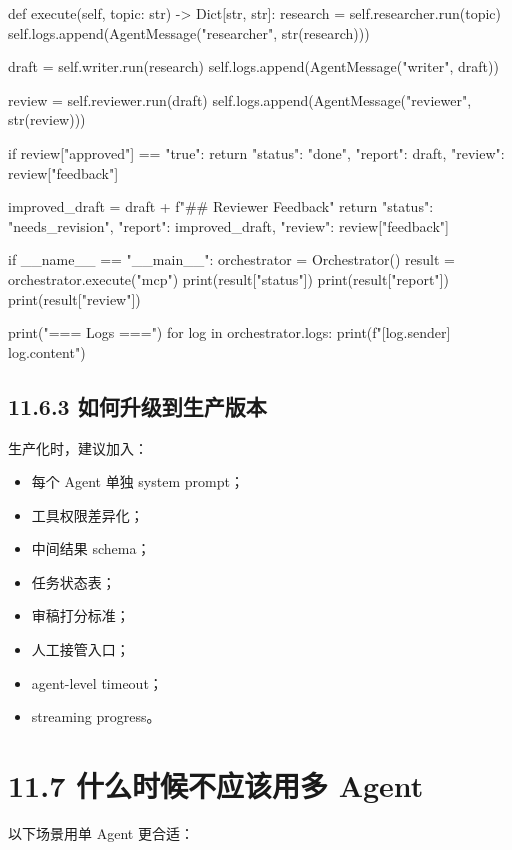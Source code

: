 \begin{codeblock}
    def execute(self, topic: str) -> Dict[str, str]:
        research = self.researcher.run(topic)
        self.logs.append(AgentMessage("researcher", str(research)))

        draft = self.writer.run(research)
        self.logs.append(AgentMessage("writer", draft))

        review = self.reviewer.run(draft)
        self.logs.append(AgentMessage("reviewer", str(review)))

        if review["approved"] == "true":
            return {"status": "done", "report": draft, "review": review["feedback"]}

        improved_draft = draft + f"\n## Reviewer Feedback\n"
        return {"status": "needs_revision", "report": improved_draft, "review": review["feedback"]}


if __name__ == "__main__":
    orchestrator = Orchestrator()
    result = orchestrator.execute("mcp")
    print(result["status"])
    print(result["report"])
    print(result["review"])

    print("\n=== Logs ===")
    for log in orchestrator.logs:
        print(f"[{log.sender}] {log.content}")
\end{codeblock}

\subsection{11.6.3 如何升级到生产版本}

生产化时，建议加入：


\begin{itemize}[leftmargin=2em]
\item 每个 Agent 单独 system prompt；
\item 工具权限差异化；
\item 中间结果 schema；
\item 任务状态表；
\item 审稿打分标准；
\item 人工接管入口；
\item agent-level timeout；
\item streaming progress。
\end{itemize}

\section{11.7 什么时候不应该用多 Agent}

以下场景用单 Agent 更合适：


